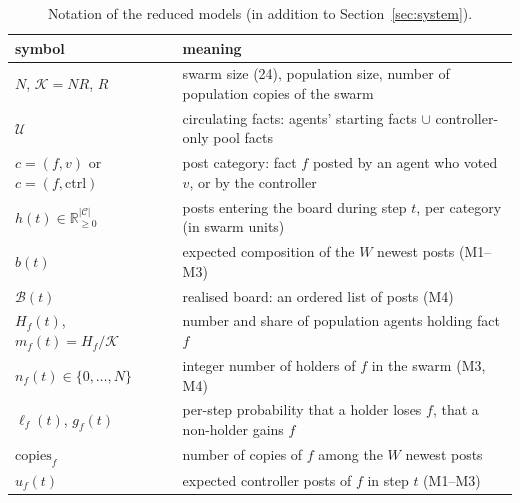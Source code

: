 \documentclass[10pt,a4paper]{article}
\newcommand{\U}{\mathcal{U}}
\begin{document}
\begin{table}[h]
\centering\small
\begin{tabular}{@{}ll@{}}
\toprule
symbol & meaning \\
\midrule
$N$, $\mathcal{K}=NR$, $R$ & swarm size (24), population size, number of population copies of the swarm \\
$\U$ & circulating facts: agents' starting facts $\cup$ controller-only pool facts \\
$c=(f,v)$ or $c=(f,\text{ctrl})$ & post category: fact $f$ posted by an agent who voted $v$, or by the controller \\
$h(t)\in\mathbb{R}_{\ge0}^{|\mathcal{C}|}$ & posts entering the board during step $t$, per category (in swarm units) \\
$b(t)$ & expected composition of the $W$ newest posts (M1--M3) \\
$\mathcal{B}(t)$ & realised board: an ordered list of posts (M4) \\
$H_f(t)$, $m_f(t)=H_f/\mathcal{K}$ & number and share of population agents holding fact $f$ \\
$n_f(t)\in\{0,\dots,N\}$ & integer number of holders of $f$ in the swarm (M3, M4) \\
$\ell_f(t)$, $g_f(t)$ & per-step probability that a holder loses $f$, that a non-holder gains $f$ \\
$\mathrm{copies}_f$ & number of copies of $f$ among the $W$ newest posts \\
$u_f(t)$ & expected controller posts of $f$ in step $t$ (M1--M3) \\
\bottomrule
\end{tabular}
\caption{Notation of the reduced models (in addition to Section~\ref{sec:system}).}
\label{tab:notation}
\end{table}
\end{document}
